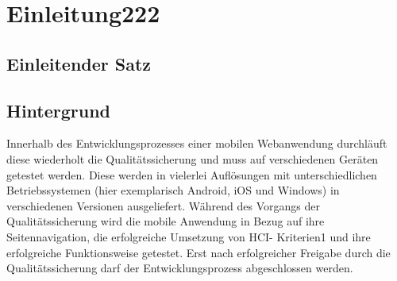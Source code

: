 \chapter{Einleitung222}

	\section{Einleitender Satz}

	\section{Hintergrund}
	Innerhalb des Entwicklungsprozesses einer mobilen Webanwendung durchläuft diese wiederholt die Qualitätssicherung und muss auf verschiedenen Geräten getestet werden. Diese werden in vielerlei Auflösungen mit 		unterschiedlichen Betriebssystemen (hier exemplarisch Android, iOS und Windows) in verschiedenen Versionen ausgeliefert. Während des Vorgangs der Qualitätssicherung wird die mobile Anwendung in Bezug auf ihre 		Seitennavigation, die erfolgreiche Umsetzung von HCI- Kriterien1 und ihre erfolgreiche Funktionsweise getestet. Erst nach erfolgreicher Freigabe durch die Qualitätssicherung darf der Entwicklungsprozess abgeschlossen 		werden.